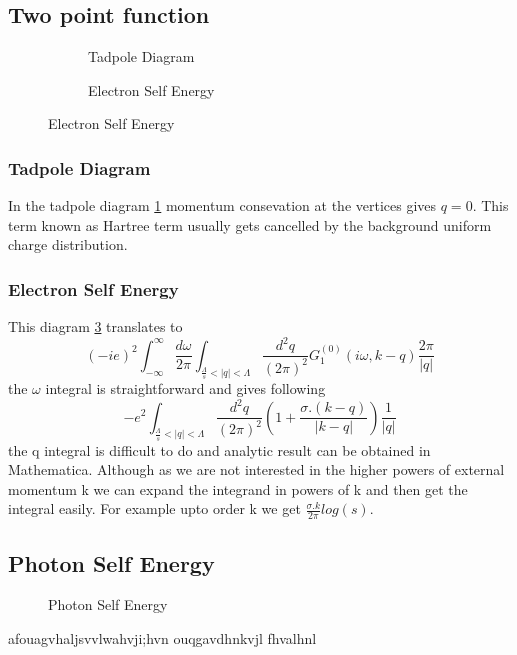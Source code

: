 \documentclass[a4paper,crop=false]{standalone}
\begin{document}
    \subsection{Two point function}
        \begin{figure}[h]
            \centering
            \begin{subfigure}[t]{0.49\textwidth}
                
                \caption{Tadpole Diagram}
                \label{tadpole}
            \end{subfigure}
            \begin{subfigure}[t]{0.49\textwidth}
                
                \caption{Electron Self Energy}
                \label{electron_self_energy}
            \end{subfigure}
        \end{figure}
        \subsubsection*{Tadpole Diagram}
            In the tadpole diagram \ref{tadpole} momentum consevation at the vertices gives $q=0$. This term known as Hartree term usually gets cancelled by the background uniform charge distribution.
        \subsubsection*{Electron Self Energy}
            This diagram \ref{electron_self_energy} translates to 
            \begin{equation}
                (-ie)^2\int^{\infty}_{-\infty}\frac{d\omega}{2\pi}\int_{\frac{\Lambda}{s}<|q|<\Lambda}\frac{d^2q}{(2\pi)^2} G^{(0)}_1(i\omega,k - q)\frac{2\pi}{|q|}
            \end{equation}
            the $\omega$ integral is straightforward and gives following
            \begin{equation}
                -e^2\int_{\frac{\Lambda}{s}<|q|<\Lambda}\frac{d^2q}{(2\pi)^2} (1 + \frac{\sigma . (k-q)}{|k-q|})\frac{1}{|q|}
            \end{equation}
            the q integral is difficult to do and analytic result can be obtained in Mathematica. Although as we are not interested in the higher powers of external momentum k we can expand the integrand in powers of k and then get the integral easily. For example upto order k we get $\frac{\sigma . k}{2\pi} log(s)$.
    \subsection*{Photon Self Energy}
        \begin{wrapfigure}{r}{0.5\textwidth}
            \centering
            
            \caption{Photon Self Energy}
            \label{fig:photon_self_energy}
        \end{wrapfigure}
        afouagvhaljsvvlwahvji;hvn ouqgavdhnkvjl  fhvalhnl
\end{document}
